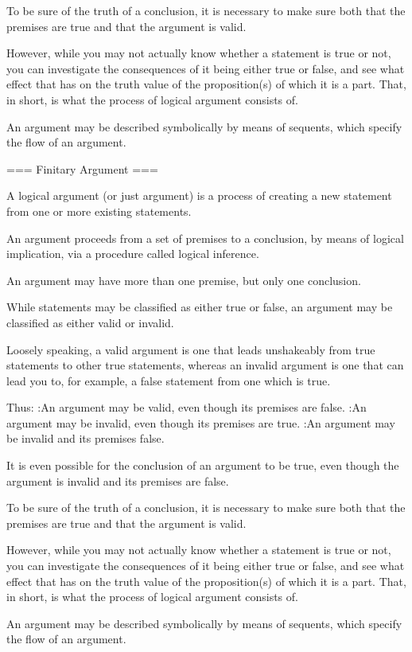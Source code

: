To be sure of the truth of a conclusion, it is necessary to make sure both that the premises are true and that the argument is valid.


However, while you may not actually know whether a statement is true or not, you can investigate the consequences of it being either true or false, and see what effect that has on the truth value of the proposition(s) of which it is a part. That, in short, is what the process of logical argument consists of.


An argument may be described symbolically by means of sequents, which specify the flow of an argument.


=== Finitary Argument ===

A logical argument (or just argument) is a process of creating a new statement from one or more existing statements.

An argument proceeds from a set of premises to a conclusion, by means of logical implication, via a procedure called logical inference.


An argument may have more than one premise, but only one conclusion.


While statements may be classified as either true or false, an argument may be classified as either valid or invalid.


Loosely speaking, a valid argument is one that leads unshakeably from true statements to other true statements, whereas an invalid argument is one that can lead you to, for example, a false statement from one which is true.


Thus:
:An argument may be valid, even though its premises are false.
:An argument may be invalid, even though its premises are true.
:An argument may be invalid and its premises false.

It is even possible for the conclusion of an argument to be true, even though the argument is invalid and its premises are false.


To be sure of the truth of a conclusion, it is necessary to make sure both that the premises are true and that the argument is valid.


However, while you may not actually know whether a statement is true or not, you can investigate the consequences of it being either true or false, and see what effect that has on the truth value of the proposition(s) of which it is a part. That, in short, is what the process of logical argument consists of.


An argument may be described symbolically by means of sequents, which specify the flow of an argument.



